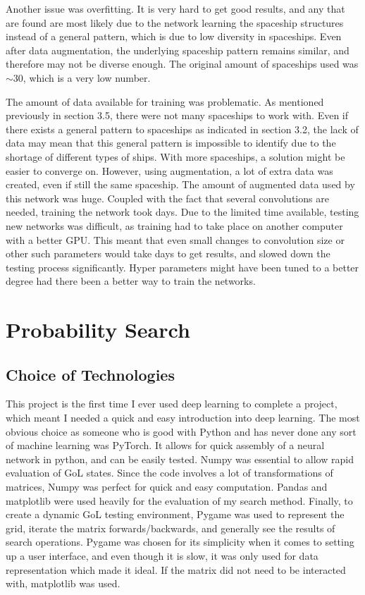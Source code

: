 \documentclass{l4proj}
\begin{document}
Another issue was overfitting. It is very hard to get good results, and any that are found are most likely due to the network learning the spaceship structures instead of a general pattern, which is due to low diversity in spaceships. Even after data augmentation, the underlying spaceship pattern remains similar, and therefore may not be diverse enough. The original amount of spaceships used was $\sim 30$, which is a very low number. 

The amount of data available for training was problematic. As mentioned previously in section 3.5, there were not many spaceships to work with. Even if there exists a general pattern to spaceships as indicated in section 3.2, the lack of data may mean that this general pattern is impossible to identify due to the shortage of different types of ships. With more spaceships, a solution might be easier to converge on. However, using augmentation, a lot of extra data was created, even if still the same spaceship. The amount of augmented data used by this network was huge. Coupled with the fact that several convolutions are needed, training the network took days. Due to the limited time available, testing new networks was difficult, as training had to take place on another computer with a better GPU. This meant that even small changes to convolution size or other such parameters would take days to get results, and slowed down the testing process significantly. Hyper parameters might have been tuned to a better degree had there been a better way to train the networks.


\section{Probability Search}

\subsection{Choice of Technologies}

This project is the first time I ever used deep learning to complete a project, which meant I needed a quick and easy introduction into deep learning. The most obvious choice as someone who is good with Python and has never done any sort of machine learning was PyTorch. It allows for quick assembly of a neural network in python, and can be easily tested. Numpy was essential to allow rapid evaluation of GoL states. Since the code involves a lot of transformations of matrices, Numpy was perfect for quick and easy computation. Pandas and matplotlib were used heavily for the evaluation of my search method. Finally, to create a dynamic GoL testing environment, Pygame was used to represent the grid, iterate the matrix forwards/backwards, and generally see the results of search operations. Pygame was chosen for its simplicity when it comes to setting up a user interface, and even though it is slow, it was only used for data representation which made it ideal. If the matrix did not need to be interacted with, matplotlib was used. 
\end{document}
